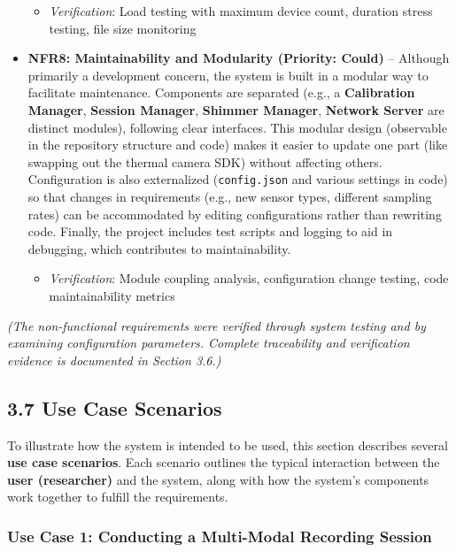 \documentclass[12pt,a4paper]{article}
\begin{document}
\begin{itemize}
  \begin{itemize}
  \tightlist
  \item
    \emph{Verification}: Load testing with maximum device count, duration stress testing, file size monitoring
  \end{itemize}
\item
  \textbf{NFR8: Maintainability and Modularity (Priority: Could)} -- Although primarily a development concern, the system is built in a modular way to facilitate maintenance. Components are separated (e.g., a \textbf{Calibration Manager}, \textbf{Session Manager}, \textbf{Shimmer Manager}, \textbf{Network Server} are distinct modules), following clear interfaces. This modular design (observable in the repository structure and code) makes it easier to update one part (like swapping out the thermal camera SDK) without affecting others. Configuration is also externalized (\passthrough{\lstinline!config.json!} and various settings in code) so that changes in requirements (e.g., new sensor types, different sampling rates) can be accommodated by editing configurations rather than rewriting code. Finally, the project includes test scripts and logging to aid in debugging, which contributes to maintainability.

  \begin{itemize}
  \tightlist
  \item
    \emph{Verification}: Module coupling analysis, configuration change testing, code maintainability metrics
  \end{itemize}
\end{itemize}

\emph{(The non-functional requirements were verified through system testing and by examining configuration parameters. Complete traceability and verification evidence is documented in Section 3.6.)}

\subsection{3.7 Use Case Scenarios}\label{use-case-scenarios}

To illustrate how the system is intended to be used, this section describes several \textbf{use case scenarios}. Each scenario outlines the typical interaction between the \textbf{user (researcher)} and the system, along with how the system's components work together to fulfill the requirements.

\subsubsection{Use Case 1: Conducting a Multi-Modal Recording Session}\label{use-case-1-conducting-a-multi-modal-recording-session}
\end{document}
